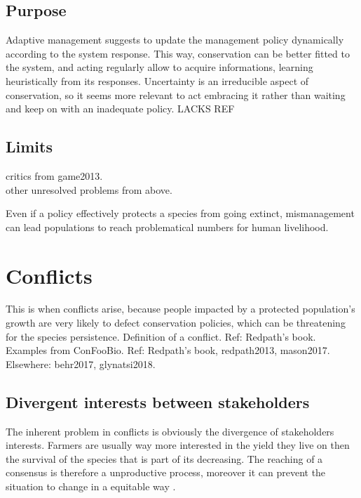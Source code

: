 \documentclass[12pt,a4paper]{article}
\begin{document}
\subsection{Purpose}

Adaptive management suggests to update the management policy dynamically according to the system response.
This way, conservation can be better fitted to the system, and acting regularly allow to acquire informations, learning heuristically from its responses.
Uncertainty is an irreducible aspect of conservation, so it seems more relevant to act embracing it rather than waiting and keep on with an inadequate policy.
LACKS REF

\subsection{Limits}

critics from game2013.\\
other unresolved problems from above.

Even if a policy effectively protects a species from going extinct, mismanagement can lead populations to reach problematical numbers for human livelihood.

\section{Conflicts}

This is when conflicts arise, because people impacted by a protected population's growth are very likely to defect conservation policies, which can be threatening for the species persistence.
Definition of a conflict. Ref: Redpath's book.\\
Examples from ConFooBio. Ref: Redpath's book, redpath2013, mason2017.
Elsewhere: behr2017, glynatsi2018.

\subsection{Divergent interests between stakeholders}
The inherent problem in conflicts is obviously the divergence of stakeholders interests.
Farmers are usually way more interested in the yield they live on then the survival of the species that is part of its decreasing.
The reaching of a consensus is therefore a unproductive process, moreover it can prevent the situation to change in a equitable way \citep{peterson2005conservation}.
\end{document}
